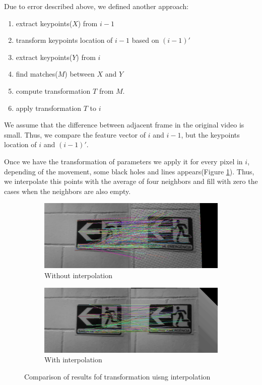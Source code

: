 Due to error described above, we defined another approach:   
\begin{enumerate}
	\item extract keypoints($X$) from $i-1$
	\item transform keypoints location of $i-1$ based on $(i-1)'$
	\item extract keypoints($Y$) from $i$
	\item find matches($M$) between $X$ and $Y$
	\item compute transformation $T$ from $M$.
	\item apply transformation $T$ to $i$
\end{enumerate}

We assume that the difference between adjacent frame in the original video is small. Thus, we compare the feature vector of $i$ and $i-1$, but the keypoints location of $i$ and $(i-1)'$.

Once we have the transformation of parameters we apply it for every pixel in $i$, depending of the movement, some black holes and lines appears(Figure \ref{fig:diff-interpolation}). Thus, we interpolate this points with the average of four neighbors and fill with zero the cases when the neighbors are also empty.

\begin{figure}[!h]
	\centering
	\begin{subfigure}{0.5\textwidth}
	  \centering
	  \includegraphics[width=0.9\linewidth]{figs/without-interpolation.jpg}
	  \caption{Without interpolation}
	\end{subfigure}%
	\begin{subfigure}{0.5\textwidth}
	  \centering
	  \includegraphics[width=0.9\linewidth]{figs/with-interpolation.jpg}
	  \caption{With interpolation}
	\end{subfigure}%
	 \caption{Comparison of results fof transformation uisng interpolation}
	\label{fig:diff-interpolation}
\end{figure}

